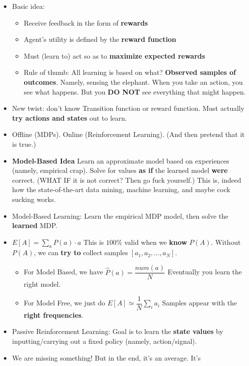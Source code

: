 \documentclass[twocolumn]{article}
\begin{document}
\begin{itemize}
\item Basic idea:
  \begin{itemize}
  \item Receive feedback in the form of \textbf{rewards}
  \item Agent's utility is defined by the \textbf{reward function}
  \item Must (learn to) act so as to \textbf{maximize expected
      rewards}
  \item Rule of thumb: All learning is based on what? \textbf{Observed
    samples of outcomes}. Namely, sensing the elephant. When you take
  an action, you see what happens. But you \textbf{DO NOT} see
  everything that might happen.
  \end{itemize}
\item New twist: don't know Transition function or reward
  function. Must actually \textbf{try actions and states} out to
  learn. 
\item Offline (MDPs). Online (Reinforcement Learning). (And then
  pretend that it is true.)
\item \textbf{Model-Based Idea} Learn an approximate model based on
  experiences (namely, empirical crap). Solve for values \textbf{as
    if} the learned model \textbf{were} correct. (WHAT IF it is not
  correct? Then go fuck yourself.) This is, indeed how the
  state-of-the-art data mining, machine learning, and maybe cock
  sucking works.
\item Model-Based Learning: Learn the empirical MDP model, then solve
  the \textbf{learned} MDP.
\item $E[A]=\sum_{a}P(a)\cdot a$ This is $100\%$ valid when we
  \textbf{know} $P(A)$. Without $P(A)$, we can \textbf{try to} collect
  samples $[a_{1},a_{2},\ldots,a_{N}]$.
  \begin{itemize}
  \item For Model Based, we have $\hat{P}(a)=\dfrac{num(a)}{N}$
    Eventually you learn the right model.\\[1pt]
  \item For Model Free, we just do $E[A]\simeq \dfrac{1}{N}\sum_{i}
    a_{i}$ Samples appear with the \textbf{right frequencies}.
  \end{itemize}
\item Passive Reinforcement Learning: Goal is to learn the
  \textbf{state values} by inputting/carrying out a fixed policy
  (namely, action/signal).
\item We are missing something! But in the end, it's an average. It's

\end{itemize}
\end{document}
